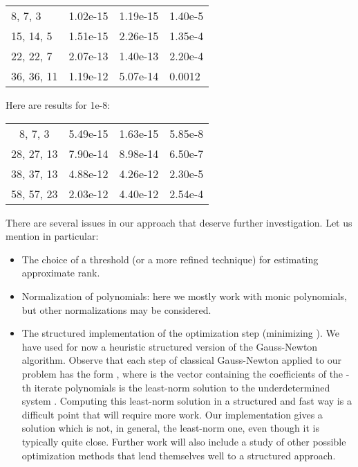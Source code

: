 \documentclass{article}
\newenvironment{itemizedot}{\begin{itemize} \renewcommand{\labelitemi}{}\renewcommand{\labelitemii}{}\renewcommand{\labelitemiii}{}\renewcommand{\labelitemiv}{}}{\end{itemize}}
\begin{document}
\begin{tabular}{|l|l|l|l|}
  \hline
   &  &  & \\
  \hline
  8, 7, 3 & 1.02e-15 & 1.19e-15 & 1.40e-5\\
  \hline
  15, 14, 5 & 1.51e-15 & 2.26e-15 & 1.35e-4\\
  \hline
  22, 22, 7 & 2.07e-13 & 1.40e-13 & 2.20e-4\\
  \hline
  36, 36, 11 & 1.19e-12 & 5.07e-14 & 0.0012\\
  \hline
\end{tabular}





Here are results for 1e-8:



\begin{tabular}{|c|c|c|c|}
  \hline
   &  &  & \\
  \hline
  8, 7, 3 & 5.49e-15 & 1.63e-15 & 5.85e-8\\
  \hline
  28, 27, 13 & 7.90e-14 & 8.98e-14 & 6.50e-7\\
  \hline
  38, 37, 13 & 4.88e-12 & 4.26e-12 & 2.30e-5\\
  \hline
  58, 57, 23 & 2.03e-12 & 4.40e-12 & 2.54e-4\\
  \hline
\end{tabular}







There are several issues in our approach that deserve further investigation.
Let us mention in particular:
\begin{itemizedot}
  \item The choice of a threshold (or a more refined technique) for estimating
  approximate rank.
  
  \item Normalization of polynomials: here we mostly work with monic
  polynomials, but other normalizations may be considered.
  
  \item The structured implementation of the optimization step (minimizing
  ). We have used for now a heuristic structured version of
  the Gauss-Newton algorithm. Observe that each step of classical Gauss-Newton
  applied to our problem has the form , where  is the vector containing the coefficients of
  the -th iterate polynomials  is the least-norm solution to the underdetermined system . Computing this least-norm
  solution in a structured and fast way is a difficult point that will require
  more work. Our implementation gives a solution which is not, in general, the
  least-norm one, even though it is typically quite close. Further work will
  also include a study of other possible optimization methods that lend
  themselves well to a structured approach.
  
  
\end{itemizedot}
\end{document}
